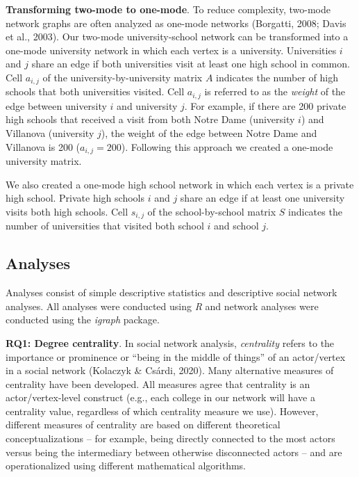 \documentclass[
  12pt,
]{article}
\begin{document}
\textbf{Transforming two-mode to one-mode}. To reduce complexity, two-mode network graphs are often analyzed as one-mode networks (Borgatti, 2008; Davis et al., 2003). Our two-mode university-school network can be transformed into a one-mode university network in which each vertex is a university. Universities \(i\) and \(j\) share an edge if both universities visit at least one high school in common. Cell \(a_{i,j}\) of the university-by-university matrix \(A\) indicates the number of high schools that both universities visited. Cell \(a_{i,j}\) is referred to as the \emph{weight} of the edge between university \(i\) and university \(j\). For example, if there are 200 private high schools that received a visit from both Notre Dame (university \(i\)) and Villanova (university \(j\)), the weight of the edge between Notre Dame and Villanova is 200 (\(a_{i,j}=200\)). Following this approach we created a one-mode university matrix.

We also created a one-mode high school network in which each vertex is a private high school. Private high schools \(i\) and \(j\) share an edge if at least one university visits both high schools. Cell \(s_{i,j}\) of the school-by-school matrix \(S\) indicates the number of universities that visited both school \(i\) and school \(j\).

\subsection{Analyses}\label{analyses}

Analyses consist of simple descriptive statistics and descriptive social network analyses. All analyses were conducted using \emph{R} and network analyses were conducted using the \emph{igraph} package.

\textbf{RQ1: Degree centrality}. In social network analysis, \emph{centrality} refers to the importance or prominence or ``being in the middle of things'' of an actor/vertex in a social network (Kolaczyk \& Csárdi, 2020). Many alternative measures of centrality have been developed. All measures agree that centrality is an actor/vertex-level construct (e.g., each college in our network will have a centrality value, regardless of which centrality measure we use). However, different measures of centrality are based on different theoretical conceptualizations -- for example, being directly connected to the most actors versus being the intermediary between otherwise disconnected actors -- and are operationalized using different mathematical algorithms.
\end{document}
